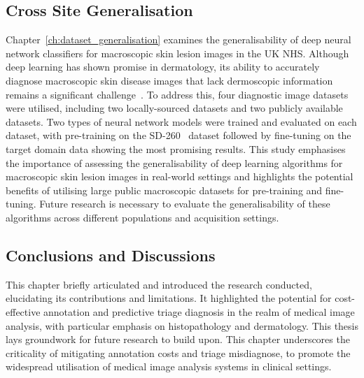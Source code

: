 \subsection*{Cross Site Generalisation}
Chapter~\ref{ch:dataset_generalisation} examines the generalisability of deep neural network classifiers for macroscopic skin lesion images in the UK NHS. Although deep learning has shown promise in dermatology, its ability to accurately diagnose macroscopic skin disease images that lack dermoscopic information remains a significant challenge~\citep{jones2022artificial}. To address this, four diagnostic image datasets were utilised, including two locally-sourced datasets and two publicly available datasets. Two types of neural network models were trained and evaluated on each dataset, with pre-training on the SD-260~\citep{yang2019self} dataset followed by fine-tuning on the target domain data showing the most promising results. This study emphasises the importance of assessing the generalisability of deep learning algorithms for macroscopic skin lesion images in real-world settings and highlights the potential benefits of utilising large public macroscopic datasets for pre-training and fine-tuning. Future research is necessary to evaluate the generalisability of these algorithms across different populations and acquisition settings.

\subsection*{Conclusions and Discussions}
This chapter briefly articulated and introduced the research conducted, elucidating its contributions and limitations. It highlighted the potential for cost-effective annotation and predictive triage diagnosis in the realm of medical image analysis, with particular emphasis on histopathology and dermatology. This thesis lays groundwork for future research to build upon. This chapter underscores the criticality of mitigating annotation costs and triage misdiagnose, to promote the widespread utilisation of medical image analysis systems in clinical settings.